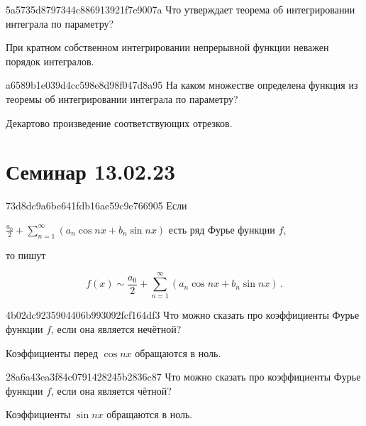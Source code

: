 \begin{note}{5a5735d8797344c886913921f7e9007a}
    Что утверждает теорема об интегрировании интеграла по параметру?

    \begin{cloze}{1}
        При кратном собственном интегрировании непрерывной функции неважен порядок интегралов.
    \end{cloze}
\end{note}

\begin{note}{a6589b1e039d4cc598e8d98f047d8a95}
    На каком множестве определена функция из теоремы об интегрировании интеграла по параметру?

    \begin{cloze}{1}
        Декартово произведение соответствующих отрезков.
    \end{cloze}
\end{note}

\section{Семинар 13.02.23}
\begin{note}{73d8dc9a6be641fdb16ae59c9e766905}
    Если \begin{icloze}{2}\({ \frac{a_0}{2} + \sum_{n=1}^{\infty} \left( a_n \cos nx + b_n \sin nx \right) }\) есть ряд Фурье функции \({ f }\),\end{icloze} то пишут
    \begin{icloze}{1}
        \[
            f(x) \sim \frac{a_0}{2} + \sum_{n=1}^{\infty} \left( a_n \cos nx + b_n \sin nx \right)\,.
        \]
    \end{icloze}
\end{note}

\begin{note}{4b02dc9235904406b993092fcf164df3}
    Что можно сказать про коэффициенты Фурье функции \({ f }\), если она является нечётной?

    \begin{cloze}{1}
        Коэффициенты перед \({ \cos nx }\) обращаются в ноль.
    \end{cloze}
\end{note}

\begin{note}{28a6a43ea3f84c0791428245b2836c87}
    Что можно сказать про коэффициенты Фурье функции \({ f }\), если она является чётной?

    \begin{cloze}{1}
        Коэффициенты \({ \sin nx }\) обращаются в ноль.
    \end{cloze}
\end{note}

